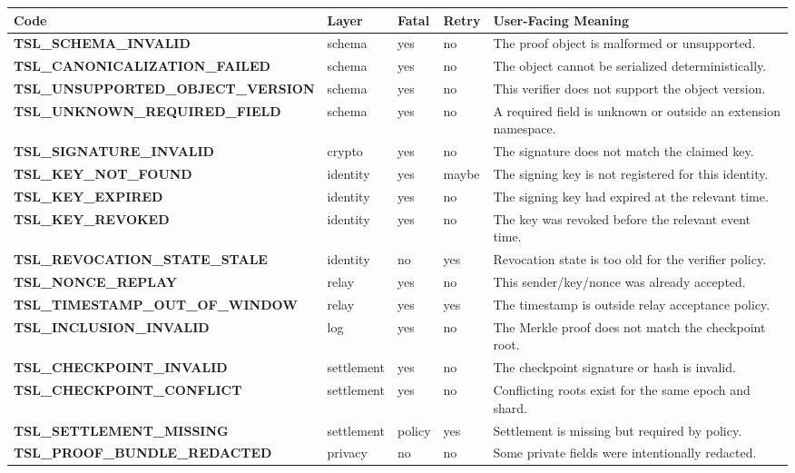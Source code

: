 \documentclass[11pt]{article}
\begin{document}
\tiny
\begin{longtable}{>{\raggedright\arraybackslash\bfseries}p{} >{\raggedright\arraybackslash}p{} >{\raggedright\arraybackslash}p{} >{\raggedright\arraybackslash}p{} >{\raggedright\arraybackslash}p{}}
\toprule
Code & Layer & Fatal & Retry & User-Facing Meaning \\
\midrule
TSL\_SCHEMA\_INVALID & schema & yes & no & The proof object is malformed or unsupported. \\
TSL\_CANONICALIZATION\_FAILED & schema & yes & no & The object cannot be serialized deterministically. \\
TSL\_UNSUPPORTED\_OBJECT\_VERSION & schema & yes & no & This verifier does not support the object version. \\
TSL\_UNKNOWN\_REQUIRED\_FIELD & schema & yes & no & A required field is unknown or outside an extension namespace. \\
TSL\_SIGNATURE\_INVALID & crypto & yes & no & The signature does not match the claimed key. \\
TSL\_KEY\_NOT\_FOUND & identity & yes & maybe & The signing key is not registered for this identity. \\
TSL\_KEY\_EXPIRED & identity & yes & no & The signing key had expired at the relevant time. \\
TSL\_KEY\_REVOKED & identity & yes & no & The key was revoked before the relevant event time. \\
TSL\_REVOCATION\_STATE\_STALE & identity & no & yes & Revocation state is too old for the verifier policy. \\
TSL\_NONCE\_REPLAY & relay & yes & no & This sender/key/nonce was already accepted. \\
TSL\_TIMESTAMP\_OUT\_OF\_WINDOW & relay & yes & yes & The timestamp is outside relay acceptance policy. \\
TSL\_INCLUSION\_INVALID & log & yes & no & The Merkle proof does not match the checkpoint root. \\
TSL\_CHECKPOINT\_INVALID & settlement & yes & no & The checkpoint signature or hash is invalid. \\
TSL\_CHECKPOINT\_CONFLICT & settlement & yes & no & Conflicting roots exist for the same epoch and shard. \\
TSL\_SETTLEMENT\_MISSING & settlement & policy & yes & Settlement is missing but required by policy. \\
TSL\_PROOF\_BUNDLE\_REDACTED & privacy & no & no & Some private fields were intentionally redacted. \\

\end{longtable}
\end{document}
